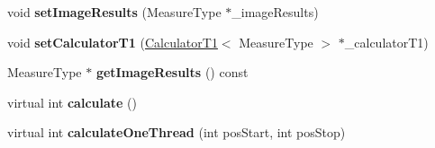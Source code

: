 \begin{DoxyCompactItemize}
\item 
\hypertarget{class_ox_1_1_image_calculator_a34d8fefe46801995b353454bfde54791}{void {\bfseries set\-Image\-Results} (Measure\-Type $\ast$\-\_\-image\-Results)}\label{class_ox_1_1_image_calculator_a34d8fefe46801995b353454bfde54791}

\item 
\hypertarget{class_ox_1_1_image_calculator_acfe17bb47e88e7ca5f576056d6fecacf}{void {\bfseries set\-Calculator\-T1} (\hyperlink{class_ox_1_1_calculator_t1}{Calculator\-T1}$<$ Measure\-Type $>$ $\ast$\-\_\-calculator\-T1)}\label{class_ox_1_1_image_calculator_acfe17bb47e88e7ca5f576056d6fecacf}

\item 
\hypertarget{class_ox_1_1_image_calculator_a1871ae99ad8bea88cd45de9bd26f0e88}{Measure\-Type $\ast$ {\bfseries get\-Image\-Results} () const }\label{class_ox_1_1_image_calculator_a1871ae99ad8bea88cd45de9bd26f0e88}

\item 
\hypertarget{class_ox_1_1_image_calculator_a078ed4a5fec8b0237154a676312f496d}{virtual int {\bfseries calculate} ()}\label{class_ox_1_1_image_calculator_a078ed4a5fec8b0237154a676312f496d}

\item 
\hypertarget{class_ox_1_1_image_calculator_a94a64117277c46dd286cdf8eeffe75e2}{virtual int {\bfseries calculate\-One\-Thread} (int pos\-Start, int pos\-Stop)}\label{class_ox_1_1_image_calculator_a94a64117277c46dd286cdf8eeffe75e2}

\end{DoxyCompactItemize}
